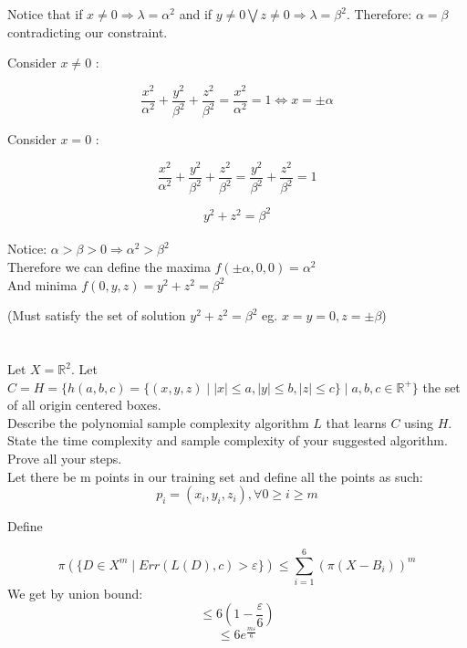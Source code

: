 \documentclass[12pt]{article}
\newcommand\tab[1][1cm]{\hspace*{#1}}
\begin{document}
Notice that if $ x \neq 0 \Rightarrow \lambda = \alpha^2$ and if $ y \neq 0 \bigvee  z \neq 0 \Rightarrow \lambda = \beta^2$. Therefore:  $\alpha = \beta$ contradicting our constraint.

Consider $x \neq 0$ :

$$ \frac{x^2}{\alpha^2} + \frac{y^2}{\beta^2} + \frac{z^2}{\beta^2} = \frac{x^2}{\alpha^2} = 1 \iff x = \pm \alpha$$

Consider $x = 0$ :

$$ \frac{x^2}{\alpha^2} + \frac{y^2}{\beta^2} + \frac{z^2}{\beta^2} = 
\frac{y^2}{\beta^2} + \frac{z^2}{\beta^2} = 1$$

$$ y^2 + z^2 = \beta^2 $$ \\ 

Notice: $\alpha > \beta > 0 \Rightarrow \alpha^2 > \beta^2$ \\

Therefore we can define the maxima $f(\pm \alpha,0,0) = \alpha^2 $\\

And minima $f(0,y,z) = y^2 + z^2 = \beta^2 $

(Must satisfy the set of solution $y^2 + z^2 = \beta^2 $ eg. $x = y = 0, z=\pm \beta$)

\newpage

\section*{}


\tab Let $X = \mathbb{R}^2$. Let $ C = H =  \lbrace h(a,b,c) = \lbrace(x,y,z) \mid |x| \leq a, |y| \leq b, |z| \leq c \rbrace \mid  a,b,c \in \mathbb{R}^+\rbrace $ the set of all origin centered boxes. \\
\tab Describe the polynomial sample complexity algorithm $L$ that learns $C$ using $H$. State the time complexity and sample complexity of your suggested algorithm. Prove all your steps. \\


Let there be m points in our training set and define all the points as such:
$$ p_i = (x_i, y_i, z_i ),  \forall 0 \geq i \geq  m $$

Define 

$$  \pi(\lbrace D \in X^m \mid Err(L(D), c) > \varepsilon  \rbrace)  \leq  \sum^6_{i = 1}(\pi(X - B_i ))^m $$  
We get by union bound:
$$ \leq  6 (1 - \frac{\varepsilon}{6})$$
$$ \leq  6 e^{\frac{m \varepsilon}{6}}$$
\end{document}
